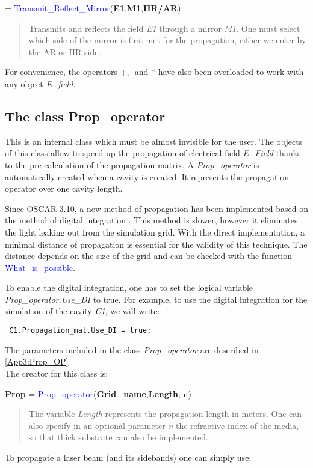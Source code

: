 = \textcolor{blue}{Transmit\_Reflect\_Mirror}(\textbf{E1},\textbf{M1},\textbf{HR/AR})
\vspace*{-0.2cm}
\begin{quote}
Transmits and reflects the field \textsl{E1} through a mirror \textsl{M1}. One must select which side of the mirror is first met for the propagation, either we enter by the AR or HR side.
\end{quote}

For convenience, the operators +,- and * have also been overloaded to work with any object \textsl{E\_field}.




\subsection{The class Prop\_operator}
\label{Sec:DI}
This is an internal class which must be almost invisible for the user. The objects of this class allow to speed up the propagation of electrical field \textsl{E\_Field} thanks to the pre-calculation of the propagation matrix. A \textsl{Prop\_operator} is automatically created when a cavity is created. It represents the propagation operator over one cavity length.

Since OSCAR 3.10, a new method of propagation has been implemented based on the method of digital integration \cite{DI_paper}. This method is slower, however it eliminates the light leaking out from the simulation grid. With the direct implementation, a minimal distance of propagation is essential for the validity of this technique. The distance depends on the size of the grid and can be checked with the function \textcolor{blue}{What\_is\_possible}.

To enable the digital integration, one has to set the logical variable \textsl{Prop\_operator.Use\_DI} to true. For example, to use the digital integration for the simulation of the cavity \textsl{C1}, we will write:

\verb? C1.Propagation_mat.Use_DI = true; ?

The parameters included in the class \textsl{Prop\_operator} are described in \ref{App3:Prop_OP}\\


The creator for this class is:

\noindent \textbf{Prop} = \textcolor{blue}{Prop\_operator}(\textbf{Grid\_name},\textbf{Length}, n)

\vspace*{-0.2cm}
\begin{quote}
The variable \textsl{Length} represents the propagation length in meters. One can also specify in an optional parameter \textsl{n} the refractive index of the media, so that thick substrate can also be implemented.
\end{quote}
To propagate a laser beam (and its sidebands) one can simply use:

